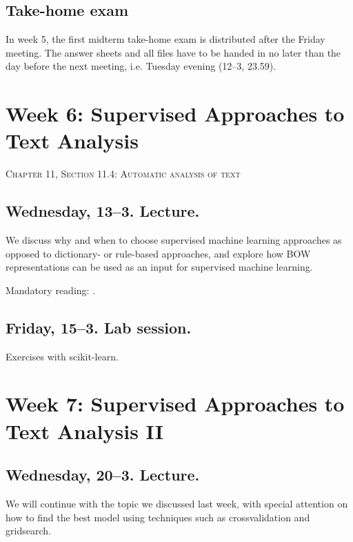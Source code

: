 \subsection*{Take-home exam}
In week 5, the first midterm take-home exam is distributed after the Friday meeting. The answer sheets and all files have to be handed in no later than the day before the next meeting, i.e. Tuesday evening (12--3, 23.59).






\section*{Week 6: Supervised Approaches to Text Analysis}
\textsc{ Chapter 11, Section 11.4: Automatic analysis of text}\\


\subsection*{Wednesday, 13--3. Lecture.}
We discuss why and when to choose supervised machine learning approaches as opposed to dictionary- or rule-based approaches, and explore how BOW representations can be used as an input for supervised machine learning.

Mandatory reading: \cite{Boumans2016}.


\subsection*{Friday, 15--3. Lab session.}
Exercises with scikit-learn.





\section*{Week 7: Supervised Approaches to Text Analysis II}


\subsection*{Wednesday, 20--3. Lecture.}
We will continue with the topic we discussed last week, with special attention on how to find the best model using techniques such as crossvalidation and gridsearch.

